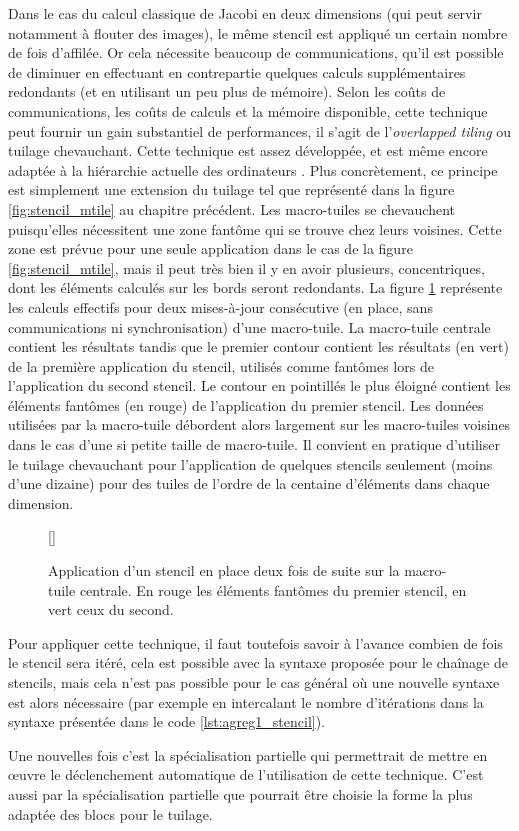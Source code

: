 Dans le cas du calcul classique de Jacobi en deux dimensions (qui peut servir notamment à flouter des images), le même stencil est appliqué un certain nombre de fois d'affilée. Or cela nécessite beaucoup de communications, qu'il est possible de diminuer en effectuant en contrepartie quelques calculs supplémentaires redondants (et en utilisant un peu plus de mémoire). Selon les coûts de communications, les coûts de calculs et la mémoire disponible, cette technique peut fournir un gain substantiel de performances, il s'agit de l'\emph{overlapped tiling} ou tuilage chevauchant. Cette technique est assez développée, et est même encore adaptée à la hiérarchie actuelle des ordinateurs \cite{Art17}. Plus concrètement, ce principe est simplement une extension du tuilage tel que représenté dans la figure \ref{fig:stencil_mtile} au chapitre précédent. Les macro-tuiles se chevauchent puisqu'elles nécessitent une zone fantôme qui se trouve chez leurs voisines. Cette zone est prévue pour une seule application dans le cas de la figure \ref{fig:stencil_mtile}, mais il peut très bien il y en avoir plusieurs, concentriques, dont les éléments calculés sur les bords seront redondants. La figure \ref{fig:stencil_mtile2} représente les calculs effectifs pour deux mises-à-jour consécutive (en place, sans communications ni synchronisation) d'une macro-tuile. La macro-tuile centrale contient les résultats tandis que le premier contour contient les résultats (en vert) de la première application du stencil, utilisés comme fantômes lors de l'application du second stencil. Le contour en pointillés le plus éloigné contient les éléments fantômes (en rouge) de l'application du premier stencil. Les données utilisées par la macro-tuile débordent alors largement sur les macro-tuiles voisines dans le cas d'une si petite taille de macro-tuile. Il convient en pratique d'utiliser le tuilage chevauchant pour l'application de quelques stencils seulement (moins d'une dizaine) pour des tuiles de l'ordre de la centaine d'éléments dans chaque dimension.

\begin{figure}[!h]
[\FBwidth]
{\caption{Application d'un stencil en place deux fois de suite sur la macro-tuile centrale. En rouge les éléments fantômes du premier stencil, en vert ceux du second.}\label{fig:stencil_mtile2}}
{}
\end{figure}

Pour appliquer cette technique, il faut toutefois savoir à l'avance combien de fois le stencil sera itéré, cela est possible avec la syntaxe proposée pour le chaînage de stencils, mais cela n'est pas possible pour le cas général où une nouvelle syntaxe est alors nécessaire (par exemple en intercalant le nombre d'itérations dans la syntaxe présentée dans le code \ref{lst:agreg1_stencil}). 

Une nouvelles fois c'est la spécialisation partielle qui permettrait de mettre en œuvre le déclenchement automatique de l'utilisation de cette technique. C'est aussi par la spécialisation partielle que pourrait être choisie la forme la plus adaptée des blocs pour le tuilage. 
